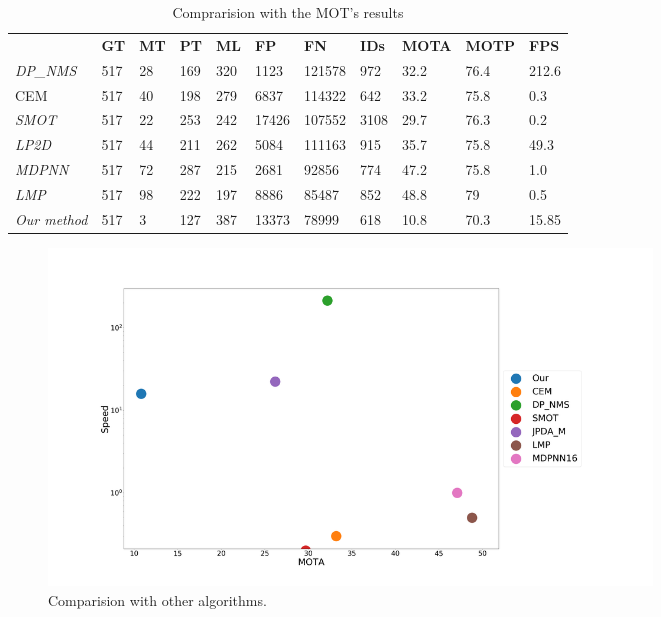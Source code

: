\begin{table}[!]
\centering
\begin{tabular}{l|llll|lll|ll|l}
                 & \textbf{GT} & \textbf{MT} & \textbf{PT} & \textbf{ML} & \textbf{FP} & \textbf{FN} & \textbf{IDs} & \textbf{MOTA} & \textbf{MOTP} & \textbf{FPS} \\
\textit{DP\_NMS} & 517         & 28          & 169         & 320         & 1123        & 121578      & 972          & 32.2          & 76.4          & 212.6        \\
CEM              & 517         & 40          & 198         & 279         & 6837        & 114322      & 642          & 33.2          & 75.8          & 0.3          \\
\textit{SMOT}    & 517         & 22          & 253         & 242         & 17426       & 107552      & 3108         & 29.7          & 76.3          & 0.2          \\
\textit{LP2D}    & 517         & 44          & 211         & 262         & 5084        & 111163      & 915          & 35.7          & 75.8          & 49.3         \\
\textit{MDPNN}   & 517         & 72          & 287         & 215         & 2681        & 92856       & 774          & 47.2          & 75.8          & 1.0          \\
\textit{LMP}     & 517         & 98          & 222         & 197         & 8886        & 85487       & 852          & 48.8          & 79            & 0.5          \\
\textit{Our method}     & 517         & 3           & 127         & 387         & 13373       & 78999       & 618          & 10.8          & 70.3          & 15.85       
\end{tabular}
\caption{Comprarision with the MOT's results}
\label{tableSOTatomeu}
\end{table}



\begin{figure}[!]
\centering         
\includegraphics[width=16cm]{comparision/timeDAta.png}
\caption{Comparision with other algorithms.} \label{experimenComp}
\end{figure}



